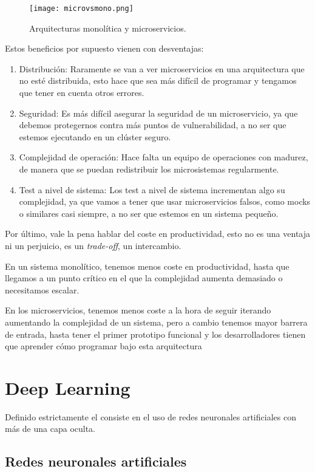 \begin{figure}
	\centering
	\texttt{[image: microvsmono.png]}
	\caption{Arquitecturas monolítica y microservicios.\cite{fow14}}\label{fig:microvsmono.png}
\end{figure}

Estos beneficios por supuesto vienen con desventajas:

\begin{enumerate}
\item Distribución: Raramente se van a ver microservicios en una arquitectura que no esté distribuida, esto hace que sea más difícil de programar y tengamos que tener en cuenta otros errores.
\item Seguridad: Es más difícil asegurar la seguridad de un microservicio, ya que debemos protegernos contra más puntos de vulnerabilidad, a no ser que estemos ejecutando en un clúster seguro.
\item Complejidad de operación: Hace falta un equipo de operaciones con madurez, de manera que se puedan redistribuir los microsistemas regularmente.
\item Test a nivel de sistema: Los test a nivel de sistema incrementan algo su complejidad, ya que vamos a tener que usar microservicios falsos, como mocks o similares casi siempre, a no ser que estemos en un sistema pequeño.
\end{enumerate}

Por último, vale la pena hablar del coste en productividad, esto no es una ventaja ni un perjuicio, es un \textit{trade-off}, un intercambio.

En un sistema monolítico, tenemos menos coste en productividad, hasta que llegamos a un punto crítico en el que la complejidad aumenta demasiado o necesitamos escalar.

En los microservicios, tenemos menos coste a la hora de seguir iterando aumentando la complejidad de un sistema, pero a cambio tenemos mayor barrera de entrada, hasta tener el primer prototipo funcional y los desarrolladores tienen que aprender cómo programar bajo esta arquitectura

\section{Deep Learning}

Definido estrictamente el  consiste en el uso de redes neuronales artificiales con más de una capa oculta. 

\subsection{Redes neuronales artificiales}

